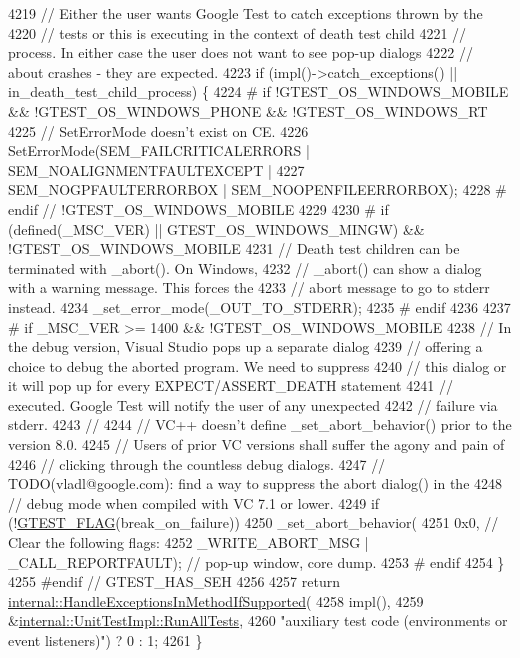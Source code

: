\begin{DoxyCode}
4219   \textcolor{comment}{// Either the user wants Google Test to catch exceptions thrown by the}
4220   \textcolor{comment}{// tests or this is executing in the context of death test child}
4221   \textcolor{comment}{// process. In either case the user does not want to see pop-up dialogs}
4222   \textcolor{comment}{// about crashes - they are expected.}
4223   \textcolor{keywordflow}{if} (impl()->catch\_exceptions() || in\_death\_test\_child\_process) \{
4224 \textcolor{preprocessor}{# if !GTEST\_OS\_WINDOWS\_MOBILE && !GTEST\_OS\_WINDOWS\_PHONE && !GTEST\_OS\_WINDOWS\_RT}
4225     \textcolor{comment}{// SetErrorMode doesn't exist on CE.}
4226     SetErrorMode(SEM\_FAILCRITICALERRORS | SEM\_NOALIGNMENTFAULTEXCEPT |
4227                  SEM\_NOGPFAULTERRORBOX | SEM\_NOOPENFILEERRORBOX);
4228 \textcolor{preprocessor}{# endif  // !GTEST\_OS\_WINDOWS\_MOBILE}
4229 
4230 \textcolor{preprocessor}{# if (defined(\_MSC\_VER) || GTEST\_OS\_WINDOWS\_MINGW) && !GTEST\_OS\_WINDOWS\_MOBILE}
4231     \textcolor{comment}{// Death test children can be terminated with \_abort().  On Windows,}
4232     \textcolor{comment}{// \_abort() can show a dialog with a warning message.  This forces the}
4233     \textcolor{comment}{// abort message to go to stderr instead.}
4234     \_set\_error\_mode(\_OUT\_TO\_STDERR);
4235 \textcolor{preprocessor}{# endif}
4236 
4237 \textcolor{preprocessor}{# if \_MSC\_VER >= 1400 && !GTEST\_OS\_WINDOWS\_MOBILE}
4238     \textcolor{comment}{// In the debug version, Visual Studio pops up a separate dialog}
4239     \textcolor{comment}{// offering a choice to debug the aborted program. We need to suppress}
4240     \textcolor{comment}{// this dialog or it will pop up for every EXPECT/ASSERT\_DEATH statement}
4241     \textcolor{comment}{// executed. Google Test will notify the user of any unexpected}
4242     \textcolor{comment}{// failure via stderr.}
4243     \textcolor{comment}{//}
4244     \textcolor{comment}{// VC++ doesn't define \_set\_abort\_behavior() prior to the version 8.0.}
4245     \textcolor{comment}{// Users of prior VC versions shall suffer the agony and pain of}
4246     \textcolor{comment}{// clicking through the countless debug dialogs.}
4247     \textcolor{comment}{// TODO(vladl@google.com): find a way to suppress the abort dialog() in the}
4248     \textcolor{comment}{// debug mode when compiled with VC 7.1 or lower.}
4249     \textcolor{keywordflow}{if} (!\hyperlink{gtest-port_8h_a828f4e34a1c4b510da50ec1563e3562a}{GTEST\_FLAG}(break\_on\_failure))
4250       \_set\_abort\_behavior(
4251           0x0,                                    \textcolor{comment}{// Clear the following flags:}
4252           \_WRITE\_ABORT\_MSG | \_CALL\_REPORTFAULT);  \textcolor{comment}{// pop-up window, core dump.}
4253 \textcolor{preprocessor}{# endif}
4254   \}
4255 \textcolor{preprocessor}{#endif  // GTEST\_HAS\_SEH}
4256 
4257   \textcolor{keywordflow}{return} \hyperlink{namespacetesting_1_1internal_addb2ed165b92b74e25fe9ebe9e46b9f9}{internal::HandleExceptionsInMethodIfSupported}(
4258       impl(),
4259       &\hyperlink{classtesting_1_1internal_1_1UnitTestImpl_a1fb6be9971f4768c4136a05aa9e7e375}{internal::UnitTestImpl::RunAllTests},
4260       \textcolor{stringliteral}{"auxiliary test code (environments or event listeners)"}) ? 0 : 1;
4261 \}
\end{DoxyCode}
